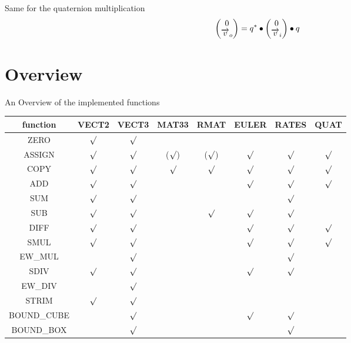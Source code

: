 Same for the quaternion multiplication
\begin{equation}
\begin{pmatrix}0\\\overrightarrow{v}_o\end{pmatrix} = q_{}^* \bullet \begin{pmatrix}0\\\overrightarrow{v}_i\end{pmatrix} \bullet q_{}
\end{equation}

\section{Overview}
An Overview of the implemented functions\\
\newcommand{\YES}{$\surd$}
\newcommand{\NO}{}
\begin{tabular}{c|ccccccc}
function	& VECT2	& VECT3	& MAT33	& RMAT	& EULER	& RATES	& QUAT	\\  \hline
ZERO		& \YES	& \YES	& \NO	& \NO	& \NO	& \NO	& \NO	\\
ASSIGN		& \YES	& \YES	&(\YES) &(\YES) & \YES	& \YES	& \YES	\\
COPY		& \YES	& \YES	& \YES	& \YES	& \YES	& \YES	& \YES	\\
ADD			& \YES	& \YES	& \NO	& \NO	& \YES	& \YES	& \YES	\\
SUM			& \YES	& \YES	& \NO	& \NO	& \NO	& \YES	& \NO	\\
SUB			& \YES	& \YES	& \NO	& \YES	& \YES	& \YES	& \NO	\\
DIFF		& \YES	& \YES	& \NO	& \NO	& \YES	& \YES	& \YES	\\
SMUL		& \YES	& \YES	& \NO	& \NO	& \YES	& \YES	& \YES	\\
EW\_MUL		& \NO	& \YES	& \NO	& \NO	& \NO	& \YES	& \NO	\\
SDIV		& \YES	& \YES	& \NO	& \NO	& \YES	& \YES	& \NO	\\
EW\_DIV		& \NO	& \YES	& \NO	& \NO	& \NO	& \NO	& \NO	\\
STRIM		& \YES	& \YES	& \NO	& \NO	& \NO	& \NO	& \NO	\\
BOUND\_CUBE	& \NO	& \YES	& \NO	& \NO	& \YES	& \YES	& \NO	\\
BOUND\_BOX	& \NO	& \YES	& \NO	& \NO	& \NO	& \YES	& \NO
\end{tabular}
